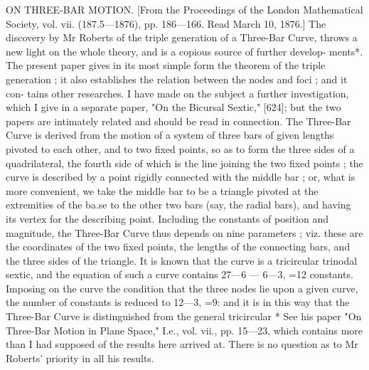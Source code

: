 \documentclass[11pt,a4paper]{book}
\begin{document}
ON THREE-BAR
MOTION.
[From the Proceedings of the London Mathematical
Society,
vol.
vii.
(187.5---1876),
pp. 186---166.
Read March
10,
1876.]
The
discovery
by Mr
Roberts
of
the
triple
generation
of
a
Three-Bar
Curve,
throws
a new
light
on
the
whole
theory,
and
is a
copious
source
of
further
develop-
ments*.
The
present paper
gives
in
its
most
simple
form
the
theorem
of
the
triple
generation
;
it
also
establishes
the
relation
between
the
nodes
and
foci
;
and
it
con-
tains
other
researches.
I
have
made
on
the
subject
a
further
investigation,
which
I
give
in
a
separate
paper, "On
the
Bicursal
Sextic," [624];
but
the
two
papers
are
intimately related and should be read
in
connection.
The
Three-Bar
Curve
is
derived
from
the
motion
of a
system
of
three
bars
of
given
lengths
pivoted
to
each
other, and
to
two
fixed
points,
so
as
to form
the three
sides
of
a
quadrilateral,
the
fourth
side
of
which
is
the
line
joining
the
two
fixed
points
;
the
curve
is
described
by a
point
rigidly
connected
with
the middle
bar
;
or,
what
is
more
convenient,
we
take
the
middle
bar
to
be
a
triangle
pivoted
at
the
extremities
of
the
ba.se
to
the
other
two
bars
(say,
the
radial
bars),
and
having
its
vertex
for the describing point.
Including
the
constants
of
position
and
magnitude,
the
Three-Bar
Curve
thus
depends
on
nine
parameters
;
viz.
these
are
the
coordinates
of
the
two
fixed
points,
the
lengths
of the
connecting
bars, and
the
three
sides
of
the
triangle.
It
is known
that the curve
is a
tricircular trinodal
sextic, and the
equation of such a curve contains
27---6 --- 6---3, =12
constants.
Imposing
on
the
curve
the
condition
that
the
three
nodes
lie
upon
a
given
curve,
the
number of
constants
is reduced
to 12---3, =9:
and
it
is
in
this way that the Three-Bar Curve
is distinguished from the general
tricircular
* See
his paper "On Three-Bar
Motion
in
Plane
Space,"
I.e.,
vol.
vii.,
pp.
15---23, which
contains more
than
I
had supposed of
the results
here
arrived
at.
There
is no question as to Mr Roberts' priority in
all his
results.
\end{document}
